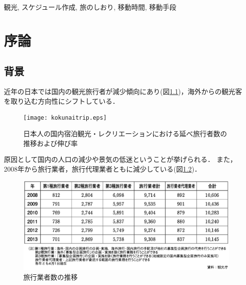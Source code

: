 \documentclass{funthesis}
\begin{document}
\begin{jkeyword}
観光, スケジュール作成, 旅のしおり, 移動時間, 移動手段
\end{jkeyword}

\tableofcontents %


\chapter{序論} %



\section{背景}
近年の日本では国内の観光旅行者が減少傾向にあり(図\ref{kokunai})\cite{kokunaitrip}，海外からの観光客を取り込む方向性にシフトしている．

\begin{figure}[htpb]
\begin{center}
\texttt{[image: kokunaitrip.eps]}
\end{center}
\caption{日本人の国内宿泊観光・レクリエーションにおける延べ旅行者数の推移および伸び率}
\label{kokunai}
\end{figure}

原因として国内の人口の減少や景気の低迷ということが挙げられる． また，2008年から旅行業者，旅行代理業者ともに減少している(図\ref{gyosya})\cite{ryokougyokai}．

\begin{figure}[htpb]
\begin{center}
\includegraphics[scale=0.67]{tripgyosya.eps}
\end{center}
\caption{旅行業者数の推移}
\label{gyosya}
\end{figure}
\end{document}
